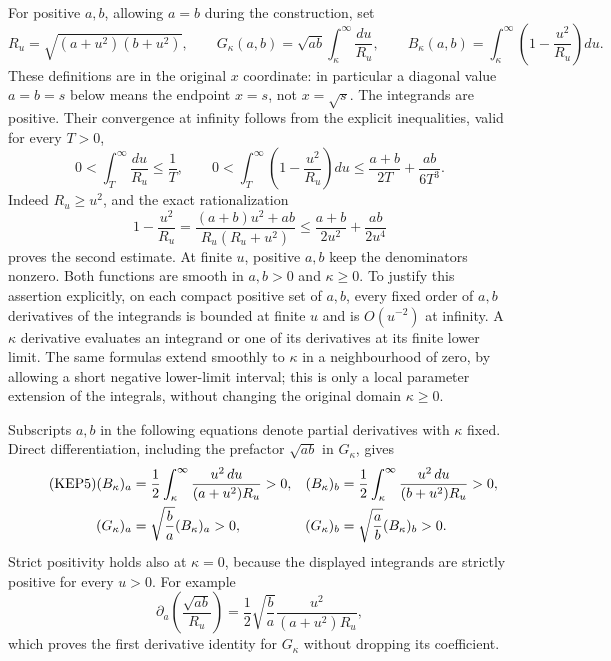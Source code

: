 \documentclass[11pt,a4paper]{article}
\begin{document}
For positive $a,b$, allowing $a=b$ during the construction, set
\begin{equation}\tag{KEP3}
 R_u=\sqrt{(a+u^2)(b+u^2)},\qquad
 G_\kappa(a,b)=\sqrt{ab}\int_\kappa^\infty\frac{du}{R_u},\qquad
 B_\kappa(a,b)=\int_\kappa^\infty\left(1-\frac{u^2}{R_u}\right)du.
\end{equation}
These definitions are in the original $x$ coordinate: in particular a
diagonal value $a=b=s$ below means the endpoint $x=s$, not $x=\sqrt{s}$.
The integrands are positive. Their convergence at infinity follows from
the explicit inequalities, valid for every $T>0$,
\begin{equation}\tag{KEP4}
 0<\int_T^\infty\frac{du}{R_u}\leq\frac1T,\qquad
 0<\int_T^\infty\left(1-\frac{u^2}{R_u}\right)du
 \leq\frac{a+b}{2T}+\frac{ab}{6T^3}.
\end{equation}
Indeed $R_u\geq u^2$, and the exact rationalization
\[
 1-\frac{u^2}{R_u}
 =\frac{(a+b)u^2+ab}{R_u(R_u+u^2)}
 \leq\frac{a+b}{2u^2}+\frac{ab}{2u^4}
\]
proves the second estimate. At finite $u$, positive $a,b$ keep the
denominators nonzero. Both functions are smooth in $a,b>0$ and $\kappa\geq0$.
To justify this assertion explicitly, on each compact positive set of
$a,b$, every fixed order of $a,b$ derivatives of the integrands is bounded
at finite $u$ and is $O(u^{-2})$ at infinity. A $\kappa$ derivative evaluates
an integrand or one of its derivatives at its finite lower limit. The
same formulas extend smoothly to $\kappa$ in a neighbourhood of zero, by
allowing a short negative lower-limit interval; this is only a local
parameter extension of the integrals, without changing the original
domain $\kappa\geq0$.

Subscripts $a,b$ in the following equations denote partial derivatives
with $\kappa$ fixed. Direct differentiation, including the prefactor
$\sqrt{ab}$ in $G_\kappa$, gives
\begin{align}\tag{KEP5}
 (B_\kappa)_a&=\frac12\int_\kappa^\infty
               \frac{u^2\,du}{(a+u^2)R_u}>0,
 & (B_\kappa)_b&=\frac12\int_\kappa^\infty
               \frac{u^2\,du}{(b+u^2)R_u}>0,\\
 (G_\kappa)_a&=\sqrt{\frac ba}(B_\kappa)_a>0,
 & (G_\kappa)_b&=\sqrt{\frac ab}(B_\kappa)_b>0.\notag
\end{align}
Strict positivity holds also at $\kappa=0$, because the displayed integrands
are strictly positive for every $u>0$. For example
\[
 \partial_a\left(\frac{\sqrt{ab}}{R_u}\right)
 =\frac12\sqrt{\frac ba}\frac{u^2}{(a+u^2)R_u},
\]
which proves the first derivative identity for $G_\kappa$ without dropping
its coefficient.
\end{document}
